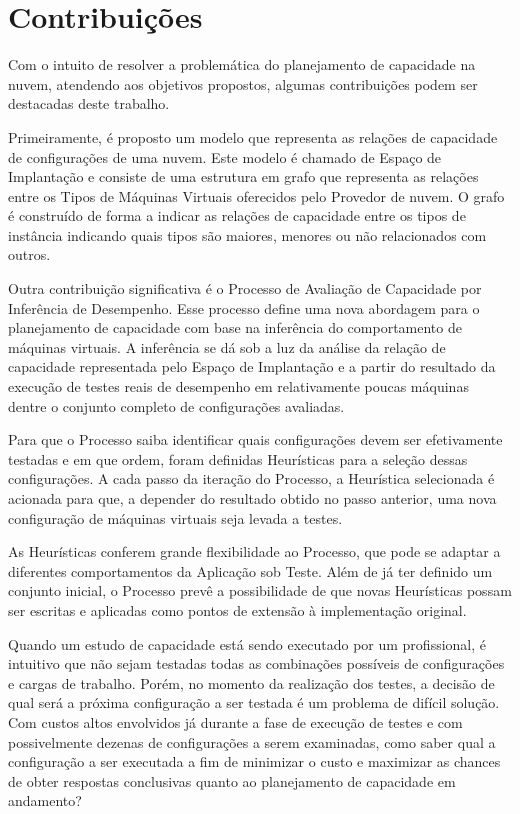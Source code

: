 \section{Contribuições}
Com o intuito de resolver a problemática do planejamento de capacidade na nuvem,
atendendo aos objetivos propostos, algumas contribuições podem ser destacadas
deste trabalho.

Primeiramente, é proposto um modelo que representa as relações de capacidade de
configurações de uma nuvem. Este modelo é chamado de Espaço de Implantação
e consiste de uma estrutura em grafo que representa as relações entre os
Tipos de Máquinas Virtuais oferecidos pelo Provedor de nuvem. O grafo é
construído de forma a indicar as relações de capacidade entre os tipos de
instância indicando quais tipos são maiores, menores ou não relacionados com
outros.

Outra contribuição significativa é o Processo de Avaliação de Capacidade por 
Inferência de Desempenho. Esse processo define uma nova abordagem para o 
planejamento de capacidade com base na inferência do comportamento de máquinas 
virtuais. A inferência se dá sob a luz da análise da relação de capacidade 
representada pelo Espaço de Implantação e a partir do resultado da execução de 
testes reais de desempenho em relativamente poucas máquinas dentre o conjunto completo de 
configurações avaliadas.

Para que o Processo saiba identificar quais configurações devem ser efetivamente
testadas e em que ordem, foram definidas Heurísticas para a seleção dessas 
configurações. A cada passo da iteração do Processo, a Heurística selecionada é
acionada para que, a depender do resultado obtido no passo anterior, uma nova
configuração de máquinas virtuais seja levada a testes.

As Heurísticas conferem grande flexibilidade ao Processo, que pode se adaptar a
diferentes comportamentos da Aplicação sob Teste. Além de já ter definido um 
conjunto inicial, o Processo prevê a possibilidade de que novas Heurísticas possam
ser escritas e aplicadas como pontos de extensão à implementação original.

Quando um estudo de capacidade está sendo executado por um profissional, é 
intuitivo que não sejam testadas todas as combinações possíveis de configurações
e cargas de trabalho. Porém, no momento da realização dos testes, a decisão de
qual será a próxima configuração a ser testada é um problema de difícil solução.
Com custos altos envolvidos já durante a fase de execução de testes e com 
possivelmente dezenas de configurações a serem examinadas, como saber qual a
configuração a ser executada a fim de minimizar o custo e maximizar as chances
de obter respostas conclusivas quanto ao planejamento de capacidade em andamento?

